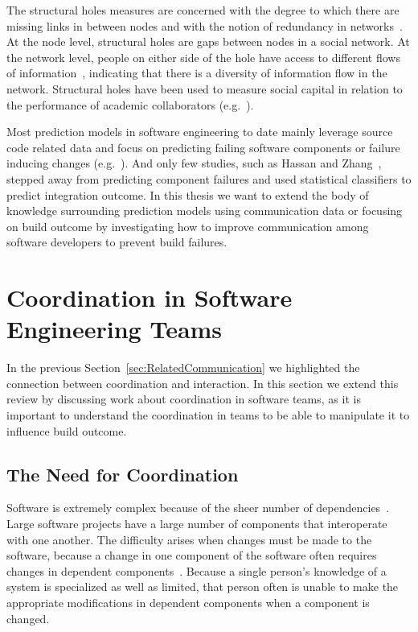 The structural holes measures are concerned with the degree to which there
are missing links in between nodes and with the notion of redundancy in
networks~\cite{Burt:1995vo}. At the node level, structural holes are gaps between
nodes in a social network. At the network level, people on either side of the
hole have access to different flows of information~\cite{Hargadon:1997asq},
indicating that there is a diversity of information flow in the network.
Structural holes have been used to measure social capital in relation to the
performance of academic collaborators (e.g.~\cite{Brambila:PICMET2007}).

Most prediction models in software engineering to date mainly leverage source
code related data and focus on predicting failing software components or failure
inducing changes
(e.g.~\cite{bell:2005tse,schroeter:isese:2006,zimmermann:icse:2008,kim:2008tse}).
And only few studies, such as Hassan and Zhang~\cite{hassan:ase:2006}, stepped away
from predicting component failures and used statistical classifiers to predict
integration outcome.
In this thesis we want to extend the body of knowledge surrounding prediction models using communication data or focusing on build outcome by investigating how to improve communication among software developers to prevent build failures.



\section{Coordination in Software Engineering Teams}
In the previous Section~\ref{sec:RelatedCommunication} we highlighted the connection between coordination and interaction.
In this section we extend this review by discussing work about coordination in software teams, as it is important to understand the coordination in teams to be able to manipulate it to influence build outcome.

\subsection{The Need for Coordination}
Software is extremely complex because of the sheer number of dependencies~\cite{sawyer2004:teams}.
Large software projects have a large number of components that interoperate with one another.
The difficulty arises when changes must be made to the software, because a change in one component of the software often requires changes in dependent components~\cite{desouza:2008}. Because a single person's knowledge of a system is specialized as well as limited, that person often is unable to make the appropriate modifications in dependent components when a component is changed.

